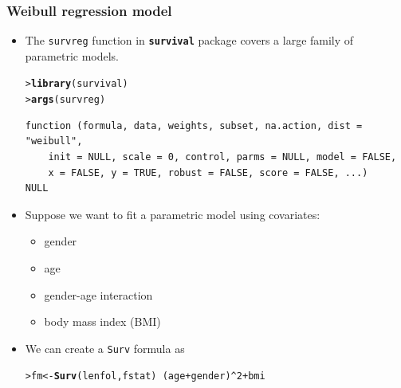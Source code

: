 \documentclass[10pt]{beamer}\usepackage[]{graphicx}\usepackage[]{color}
\makeatletter
\newcommand{\hlnum}[1]{\textcolor[rgb]{0.686,0.059,0.569}{#1}}%
\newcommand{\hlopt}[1]{\textcolor[rgb]{0,0,0}{#1}}%
\newcommand{\hlstd}[1]{\textcolor[rgb]{0.345,0.345,0.345}{#1}}%
\newcommand{\hlkwb}[1]{\textcolor[rgb]{0.69,0.353,0.396}{#1}}%
\newcommand{\hlkwd}[1]{\textcolor[rgb]{0.737,0.353,0.396}{\textbf{#1}}}%
\newenvironment{kframe}{%
 \def\at@end@of@kframe{}%
 \ifinner\ifhmode%
  \def\at@end@of@kframe{\end{minipage}}%
  \begin{minipage}{\columnwidth}%
 \fi\fi%
 \def\FrameCommand##1{\hskip\@totalleftmargin \hskip-\fboxsep
 \colorbox{shadecolor}{##1}\hskip-\fboxsep
     \hskip-\linewidth \hskip-\@totalleftmargin \hskip\columnwidth}%
 \MakeFramed {\advance\hsize-\width
   \@totalleftmargin\z@ \linewidth\hsize
   \@setminipage}}%
 {\par\unskip\endMakeFramed%
 \at@end@of@kframe}
\newenvironment{knitrout}{}{} %
\renewenvironment{knitrout}{\setlength{\topsep}{-.2mm}}{}
\newcommand{\pkg}[1]{{\textbf{\texttt{#1}}}}
\newcommand{\code}[1]{{\texttt{#1}}}
\makeatother
\begin{document}
\begin{frame}[fragile]
  \frametitle{Weibull regression model}
  \begin{itemize}
  \item The \code{survreg} function in \pkg{survival} package
    covers a large family of parametric models.
\begin{knitrout}\scriptsize
{}\color{fgcolor}\begin{kframe}
\begin{alltt}
\hlstd{> }\hlkwd{library}\hlstd{(survival)}
\hlstd{> }\hlkwd{args}\hlstd{(survreg)}
\end{alltt}
\begin{verbatim}
function (formula, data, weights, subset, na.action, dist = "weibull", 
    init = NULL, scale = 0, control, parms = NULL, model = FALSE, 
    x = FALSE, y = TRUE, robust = FALSE, score = FALSE, ...) 
NULL
\end{verbatim}
\end{kframe}
\end{knitrout}
  \item Suppose we want to fit a parametric model using covariates:
    \begin{itemize}
    \item gender
    \item age
    \item gender-age interaction
    \item  body mass index (BMI)
    \end{itemize}
  \item We can create a \code{Surv} formula as
\begin{knitrout}\scriptsize
{}\color{fgcolor}\begin{kframe}
\begin{alltt}
\hlstd{> }\hlstd{fm} \hlkwb{<-} \hlkwd{Surv}\hlstd{(lenfol, fstat)} \hlopt{~} \hlstd{(age} \hlopt{+} \hlstd{gender)}\hlopt{^}\hlnum{2} \hlopt{+} \hlstd{bmi}
\end{alltt}
\end{kframe}
\end{knitrout}
\end{itemize}
\end{frame}
\end{document}
